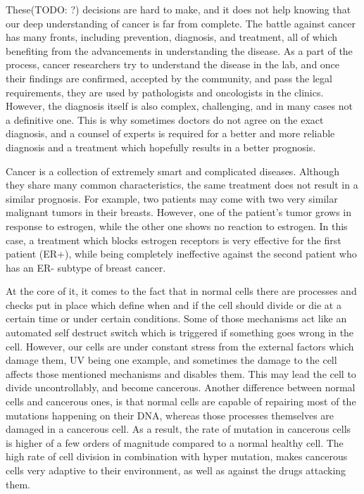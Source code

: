 These(TODO: ?) decisions are hard to make, and it does not help knowing that
our deep understanding of cancer is far from complete. The battle against
cancer has many fronts, including prevention, diagnosis, and treatment, all of
which benefiting from the advancements in understanding the disease. As a part
of the process, cancer researchers try to understand the disease in the lab,
and once their findings are confirmed, accepted by the community, and pass the
legal requirements, they are used by pathologists and oncologists in the
clinics. However, the diagnosis itself is also complex, challenging, and in
many cases not a definitive one. This is why sometimes doctors do not agree on
the exact diagnosis, and a counsel of experts is required for a better and more
reliable diagnosis and a treatment which hopefully results in a better
prognosis.

Cancer is a collection of extremely smart and complicated diseases. Although
they share many common characteristics, the same treatment does not result in a
similar prognosis. For example, two patients may come with two very similar
malignant tumors in their breasts. However, one of the patient's tumor grows in
response to estrogen, while the other one shows no reaction to estrogen. In
this case, a treatment which blocks estrogen receptors is very effective for
the first patient (ER+), while being completely ineffective against the second
patient who has an ER- subtype of breast cancer.

At the core of it, it comes to the fact that in normal cells there are
processes and checks put in place which define when and if the cell should
divide or die at a certain time or under certain conditions. Some of those
mechanisms act like an automated self destruct switch which is triggered if
something goes wrong in the cell. However, our cells are under constant stress
from the external factors which damage them, UV being one example, and
sometimes the damage to the cell affects those mentioned mechanisms and
disables them. This may lead the cell to divide uncontrollably, and become
cancerous. Another difference between normal cells and cancerous ones, is that
normal cells are capable of repairing most of the mutations happening on their
DNA, whereas those processes themselves are damaged in a cancerous cell. As a
result, the rate of mutation in cancerous cells is higher of a few orders of
magnitude compared to a normal healthy cell. The high rate of cell division in
combination with hyper mutation, makes cancerous cells very adaptive to their
environment, as well as against the drugs attacking them.

